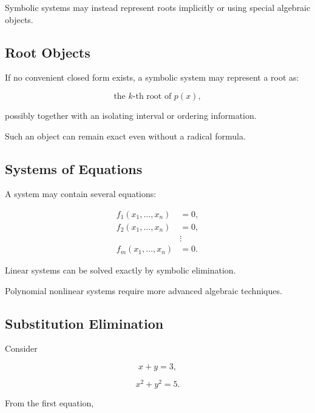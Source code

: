Symbolic systems may instead represent roots implicitly or using special
algebraic objects.

\subsection{Root Objects}
\label{subsec:symbolic-root-objects}

If no convenient closed form exists, a symbolic system may represent a
root as:

\[
\boxed{
\text{the }k\text{-th root of }p(x),
}
\]

possibly together with an isolating interval or ordering information.

Such an object can remain exact even without a radical formula.

\subsection{Systems of Equations}
\label{subsec:symbolic-systems-equations}

A system may contain several equations:

\[
\boxed{
\begin{aligned}
f_1(x_1,\ldots,x_n)&=0,\\
f_2(x_1,\ldots,x_n)&=0,\\
&\vdots\\
f_m(x_1,\ldots,x_n)&=0.
\end{aligned}
}
\]

Linear systems can be solved exactly by symbolic elimination.

Polynomial nonlinear systems require more advanced algebraic techniques.

\subsection{Substitution Elimination}
\label{subsec:symbolic-substitution-elimination}

Consider

\[
x+y=3,
\]

\[
x^2+y^2=5.
\]

From the first equation,

